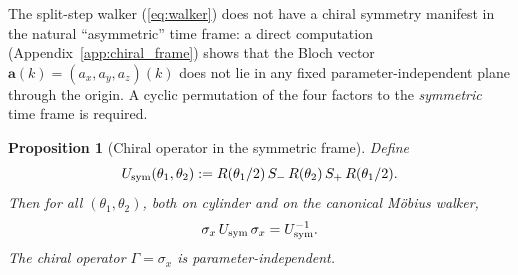 \documentclass[aps,pra,reprint,amsmath,amssymb,superscriptaddress,nofootinbib,longbibliography]{revtex4-2}
\newcommand{\sigx}{\sigma_x}
\newtheorem{proposition}{Proposition}
\begin{document}
The split-step walker (\ref{eq:walker}) does not have a chiral symmetry manifest in the natural ``asymmetric'' time frame: a direct computation (Appendix~\ref{app:chiral_frame}) shows that the Bloch vector $\mathbf{a}(k) = (a_x, a_y, a_z)(k)$ does not lie in any fixed parameter-independent plane through the origin. A cyclic permutation of the four factors to the \emph{symmetric} time frame is required.

\begin{proposition}[Chiral operator in the symmetric frame]
\label{prop:chiral}
Define
\begin{equation}
U_{\rm sym}(\theta_1, \theta_2) := R(\theta_1/2)\, S_-\, R(\theta_2)\, S_+\, R(\theta_1/2).
\label{eq:U_sym}
\end{equation}
Then for all $(\theta_1, \theta_2)$, both on cylinder and on the canonical M\"obius walker,
\begin{equation}
\sigx\, U_{\rm sym}\, \sigx = U_{\rm sym}^{-1}.
\end{equation}
The chiral operator $\Gamma = \sigx$ is parameter-independent.
\end{proposition}
\end{document}
